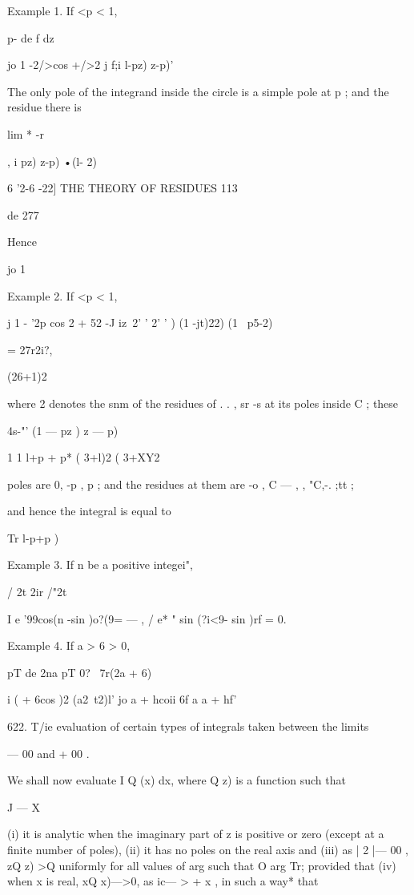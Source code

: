 Example 1. If <p < 1,

p- de f dz

jo 1 -2/>cos +/>2 j f;i l-pz) z-p)'

The only pole of the integrand inside the circle is a simple pole at p
; and the residue there is

lim * -r



, i pz) z-p) •(l- 2)



6 '2-6 -22] THE THEORY OF RESIDUES 113

de 277



Hence



jo 1



  Example 2. If <p < 1,

j 1 - '2p cos 2 + 52 -J iz\ 2' ' 2' ' ) (1 -jt)22) (1 \ p5-2)

= 27r2i?,

(26+1)2

where 2 denotes the snm of the residues of . . , sr -s at its poles
inside C ; these

4s-"' (1 — pz ) z — p)

1 1 l+p + p* ( 3+l)2 ( 3+XY2

poles are 0, -p , p ; and the residues at them are -o , C — , , "C,-.
;tt ;

and hence the integral is equal to

Tr l-p+p )

Example 3. If n be a positive integei",

/ 2t 2ir /"2t

I e '99cos(n -sin )o?(9= — , / e* " sin (?i<9- sin )rf = 0.

Example 4. If a > 6 > 0,

pT de 2na pT 0? \ 7r(2a + 6)

i ( + 6cos )2 (a2\ t2)l' jo a + hcoii 6f a a + hf'

622. T/ie evaluation of certain types of integrals taken between the
limits

— 00 and + 00 .

We shall now evaluate I Q (x) dx, where Q z) is a function such that

J — X

(i) it is analytic when the imaginary part of z is positive or zero
(except at a finite number of poles), (ii) it has no poles on the real
axis and (iii) as | 2 |— 00 , zQ z) >Q uniformly for all values of arg
such that O arg Tr; provided that (iv) when x is real, xQ x)—>0, as
ic— > + x , in such a way* that

